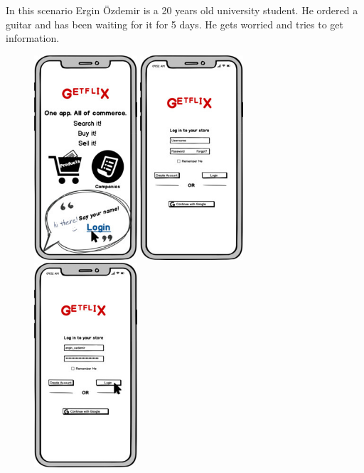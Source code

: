 \documentclass[]{article}
\begin{document}
In this scenario Ergin Özdemir is a 20 years old university student. He
ordered a guitar and has been waiting for it for 5 days. He gets worried
and tries to get information.

\begin{figure}[H]
    \centering
    \includegraphics[height=3in]{./images/11.jpg}
    \includegraphics[height=3in]{./images/12.jpg}
    \includegraphics[height=3in]{./images/13.jpg}
\end{figure}
\end{document}
